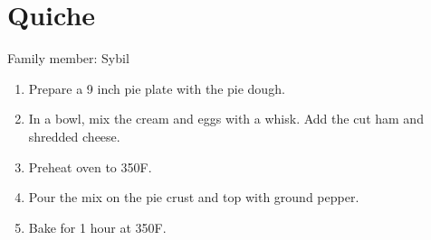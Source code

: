 \chapter{Quiche}
\label{ch:hamquiche}


Family member: Sybil

\begin{enumerate}
    \item Prepare a 9 inch pie plate with the pie dough.
    \item In a bowl, mix the cream and eggs with a whisk. Add the cut ham and shredded cheese.
    \item Preheat oven to 350\degree F.
    \item Pour the mix on the pie crust and top with ground pepper.
    \item Bake for 1 hour at 350\degree F.
\end{enumerate}

